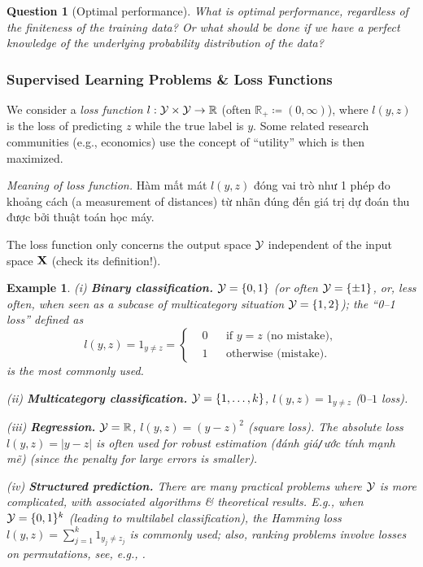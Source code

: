 \documentclass{article}
\newtheorem{example}{Example}
\newtheorem{question}{Question}
\begin{document}
\begin{question}[Optimal performance]
	What is optimal performance, regardless of the finiteness of the training data? Or what should be done if we have a perfect knowledge of the underlying probability distribution of the data?
\end{question}

\subsubsection{Supervised Learning Problems \& Loss Functions}
We consider a {\it loss function} $l:{\cal Y}\times{\cal Y}\to\mathbb{R}$ (often $\mathbb{R}_+\coloneqq(0,\infty)$), where $l(y,z)$ is the loss of predicting $z$ while the true label is $y$. Some related research communities (e.g., economics) use the concept of ``utility'' which is then maximized.

{\it Meaning of loss function.} Hàm mất mát $l(y,z)$ đóng vai trò như 1 phép đo khoảng cách (a measurement of distances) từ nhãn đúng đến giá trị dự đoán thu được bởi thuật toán học máy.

The loss function only concerns the output space ${\cal Y}$ independent of the input space ${\bf X}$ (check its definition!).
\begin{example}
	\item(i) {\bf Binary classification.} ${\cal Y} = \{0,1\}$ (or often ${\cal Y} = \{\pm1\}$, or, less often, when seen as a subcase of multicategory situation ${\cal Y} = \{1,2\}$); the ``0--1 loss'' defined as
	\begin{equation*}
		l(y,z) = 1_{y\ne z} = \left\{\begin{split}
			&0&&\mbox{if } y = z\mbox{ (no mistake)},\\
			&1&&\mbox{otherwise (mistake)}.
		\end{split}\right.
	\end{equation*}
	is the most commonly used.
	\item(ii) {\bf Multicategory classification.} ${\cal Y} = \{1,\ldots,k\}$, $l(y,z) = 1_{y\ne z}$ ($0$--$1$ loss).
	\item(iii) {\bf Regression.} ${\cal Y} = \mathbb{R}$, $l(y,z) = (y - z)^2$ (square loss). The absolute loss $l(y,z) = |y - z|$ is often used for robust estimation (đánh giá{\tt/}ước tính mạnh mẽ) (since the penalty for large errors is smaller).
	\item(iv) {\bf Structured prediction.} There are many practical problems where ${\cal Y}$ is more complicated, with associated algorithms \& theoretical results. E.g., when ${\cal Y} = \{0,1\}^k$ (leading to \emph{multilabel classification}), the \emph{Hamming loss} $l(y,z) = \sum_{j=1}^k 1_{y_j\ne z_j}$ is commonly used; also, ranking problems involve losses on permutations, see, e.g., \cite[Chap. 13: Structured Prediction]{Bach2024}.
\end{example}
\end{document}
